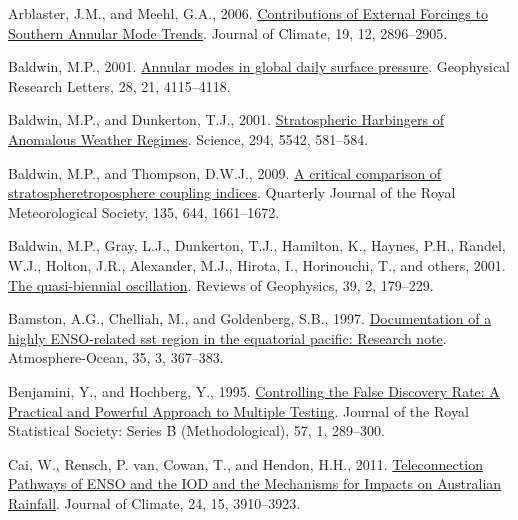 \documentclass[12pt,oneside]{reedthesis}
\newlength{\cslhangindent}
\newenvironment{CSLReferences}[2] %
 {%
  \setlength{\parindent}{0pt}
  \ifodd #1 \everypar{\setlength{\hangindent}{\cslhangindent}}\ignorespaces\fi
  \ifnum #2 > 0
  \setlength{\parskip}{#2\baselineskip}
  \fi
 }%
 {}
\begin{document}
\hypertarget{refs}{}
\begin{CSLReferences}{1}{0}
\leavevmode{}%
Arblaster, J.M., and Meehl, G.A., 2006. \href{https://doi.org/10.1175/JCLI3774.1}{Contributions of {External Forcings} to {Southern Annular Mode Trends}}. Journal of Climate, 19, 12, 2896--2905.

\leavevmode{}%
Baldwin, M.P., 2001. \href{https://doi.org/10.1029/2001GL013564}{Annular modes in global daily surface pressure}. Geophysical Research Letters, 28, 21, 4115--4118.

\leavevmode{}%
Baldwin, M.P., and Dunkerton, T.J., 2001. \href{https://doi.org/10.1126/science.1063315}{Stratospheric {Harbingers} of {Anomalous Weather Regimes}}. Science, 294, 5542, 581--584.

\leavevmode{}%
Baldwin, M.P., and Thompson, D.W.J., 2009. \href{https://doi.org/10.1002/qj.479}{A critical comparison of stratosphere\textendash troposphere coupling indices}. Quarterly Journal of the Royal Meteorological Society, 135, 644, 1661--1672.

\leavevmode{}%
Baldwin, M.P., Gray, L.J., Dunkerton, T.J., Hamilton, K., Haynes, P.H., Randel, W.J., Holton, J.R., Alexander, M.J., Hirota, I., Horinouchi, T., and others, 2001. \href{https://doi.org/10.1029/1999RG000073}{The quasi-biennial oscillation}. Reviews of Geophysics, 39, 2, 179--229.

\leavevmode{}%
Bamston, A.G., Chelliah, M., and Goldenberg, S.B., 1997. \href{https://doi.org/10.1080/07055900.1997.9649597}{Documentation of a highly {ENSO}-related sst region in the equatorial pacific: {Research} note}. Atmosphere-Ocean, 35, 3, 367--383.

\leavevmode{}%
Benjamini, Y., and Hochberg, Y., 1995. \href{https://doi.org/10.1111/j.2517-6161.1995.tb02031.x}{Controlling the {False Discovery Rate}: {A Practical} and {Powerful Approach} to {Multiple Testing}}. Journal of the Royal Statistical Society: Series B (Methodological), 57, 1, 289--300.

\leavevmode{}%
Cai, W., Rensch, P. van, Cowan, T., and Hendon, H.H., 2011. \href{https://doi.org/10.1175/2011JCLI4129.1}{Teleconnection {Pathways} of {ENSO} and the {IOD} and the {Mechanisms} for {Impacts} on {Australian Rainfall}}. Journal of Climate, 24, 15, 3910--3923.


\end{CSLReferences}
\end{document}
